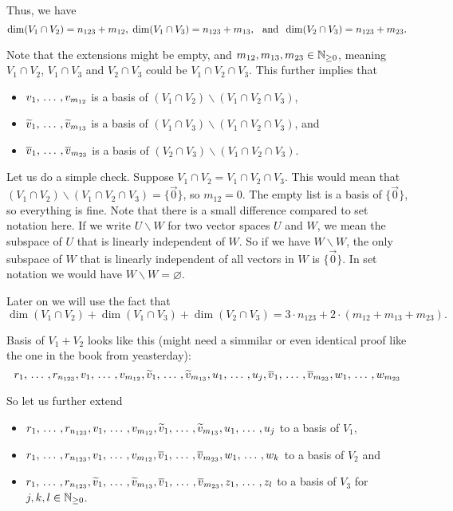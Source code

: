 \begin{xrcs}
  Thus, we have
  \begin{equation}
    \label{eq: dim for V_1 cap V_2, V_1 cap V_3, V_2 cap V_3}
    \dim (V_1 \cap V_2) = n_{123} + m_{12}, \; \dim (V_1 \cap V_3) = n_{123} + m_{13}, \;\;\, \text{and}\;\; \dim (V_2 \cap V_3) = n_{123} + m_{23}.
  \end{equation}

  Note that the extensions might be empty, and $m_{12}, m_{13}, m_{23} \in \mathbb{N}_{\geq 0}$, meaning $V_1 \cap V_2$, $V_1 \cap V_3$ and $V_2 \cap V_3$ could be $V_1 \cap V_2 \cap V_3$. This further implies that
  \begin{itemize}
    \item $v_1, {\, \ldots \,\,}, v_{m_{12}}$ is a basis of $(V_1 \cap V_2) \backslash (V_1 \cap V_2 \cap V_3)$,
    \item $\widetilde{v}_1, {\, \ldots \,\,}, \widetilde{v}_{m_{13}}$ is a basis of $(V_1 \cap V_3) \backslash (V_1 \cap V_2 \cap V_3)$, and
    \item $\overline{v}_1, {\, \ldots \,\,}, \overline{v}_{m_{23}}$ is a basis of $(V_2 \cap V_3) \backslash (V_1 \cap V_2 \cap V_3)$.
  \end{itemize}
  Let us do a simple check. Suppose $V_1 \cap V_2 =  V_1 \cap V_2 \cap V_3$. This would mean that
  $(V_1 \cap V_2) \backslash (V_1 \cap V_2 \cap V_3) = \{ \vec 0 \}$, so $m_{12} = 0$. The empty list is a basis of $\{ \vec 0 \}$, so everything is fine. Note that there is a small difference compared to set notation here. If we write $U \backslash W$ for two vector spaces $U$ and $W$, we mean the subspace of $U$ that is linearly independent of $W$. So if we have $W \backslash W$, the only subspace of $W$ that is linearly independent of all vectors in $W$ is $\{ \vec 0 \}$. In set notation we would have $W \backslash W = \varnothing$.


  Later on we will use the fact that
  \begin{equation}
    \label{eq: fact for dim}
    \dim (V_1 \cap V_2) + \dim (V_1 \cap V_3) + \dim (V_2 \cap V_3) = 3\cdot n_{123} + 2\cdot (m_{12} + m_{13} + m_{23}).
  \end{equation}

  Basis of $V_1 + V_2$ looks like this (might need a simmilar or even identical proof like the one in the book from yeasterday):
  \[ r_1, {\, \ldots \,\,}, r_{n_{123}}, v_1, {\, \ldots \,\,}, v_{m_{12}}, \widetilde{v}_1, {\, \ldots \,\,}, \widetilde{v}_{m_{13}}, u_1, {\, \ldots \,\,}, u_j, \overline{v}_1, {\, \ldots \,\,}, \overline{v}_{m_{23}}, w_1, {\, \ldots \,\,}, w_{m_{23}}
  \]


  So let us further extend
  \begin{itemize}
    \item $r_1, {\, \ldots \,\,}, r_{n_{123}}, v_1, {\, \ldots \,\,}, v_{m_{12}}, \widetilde{v}_1, {\, \ldots \,\,}, \widetilde{v}_{m_{13}}, u_1, {\, \ldots \,\,}, u_j$ to a basis of $V_1$,
    \item $r_1, {\, \ldots \,\,}, r_{n_{123}}, v_1, {\, \ldots \,\,}, v_{m_{12}}, \overline{v}_1, {\, \ldots \,\,}, \overline{v}_{m_{23}}, w_1, {\, \ldots \,\,}, w_k$ to a basis of $V_2$ and
    \item $r_1, {\, \ldots \,\,}, r_{n_{123}}, \widetilde{v}_1, {\, \ldots \,\,}, \widetilde{v}_{m_{13}}, \overline{v}_1, {\, \ldots \,\,}, \overline{v}_{m_{23}}, z_1, {\, \ldots \,\,}, z_l$ to a basis of $V_3$ for $j,k,l \in \mathbb{N}_{\geq 0}$.
  \end{itemize}


\end{xrcs}
